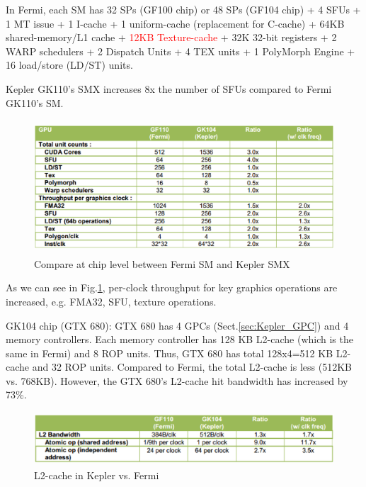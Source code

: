\begin{framed}
In Fermi, each SM has 32 SPs (GF100 chip) or 48 SPs (GF104 chip) + 4 SFUs + 1 MT
issue + 1 I-cache + 1 uniform-cache (replacement for C-cache) + 64KB shared-memory/L1
cache + \textcolor{red}{12KB Texture-cache} + 32K 32-bit
registers + 2 WARP schedulers + 2 Dispatch Units + 4 TEX units + 1
PolyMorph Engine + 16 load/store (LD/ST) units.

\end{framed}

Kepler GK110's SMX increases 8x the number of SFUs compared to Fermi GK110's SM.
\begin{figure}[hbt]
  \centerline{\includegraphics[height=5cm,
    angle=0]{./images/Kepler_Fermi_compare_SM.eps}}
  \caption{Compare at chip level between Fermi SM and Kepler SMX}
  \label{fig:SMX_SM}
\end{figure}

As we can see in Fig.\ref{fig:SMX_SM}, per-clock throughput for key graphics
operations are increased, e.g. FMA32, SFU, texture operations. 

GK104 chip (GTX 680): GTX 680 has 4 GPCs (Sect.\ref{sec:Kepler_GPC}) and 4
memory controllers. Each memory controller has 128 KB L2-cache (which is the
same in Fermi) and 8 ROP units. Thus, GTX 680 has total 128x4=512 KB L2-cache
and 32 ROP units. Compared to Fermi, the total L2-cache is less (512KB vs.
768KB). However, the GTX 680's L2-cache hit bandwidth has increased by 73\%.
  
\begin{figure}[hbt]
  \centerline{\includegraphics[height=2cm,
    angle=0]{./images/L2cache_Kepler.eps}}
  \caption{L2-cache in Kepler vs. Fermi}
\label{fig:L2cache_Kepler}
\end{figure}


